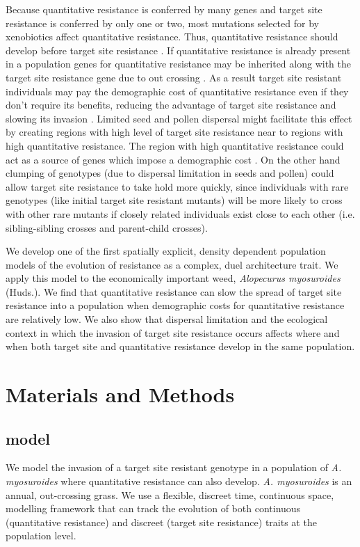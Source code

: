 \documentclass[10pt,letterpaper]{article}
\begin{document}
Because quantitative resistance is conferred by many genes and target site resistance is conferred by only one or two, most mutations selected for by xenobiotics affect quantitative resistance. Thus, quantitative resistance should develop before target site resistance \cite{Dely2010newPhy}. If quantitative resistance is already present in a population genes for quantitative resistance may be inherited along with the target site resistance gene due to out crossing \cite{Yeam2015}. As a result target site resistant individuals may pay the demographic cost of quantitative resistance even if they don't require its benefits, reducing the advantage of target site resistance and slowing its invasion \cite{Chev2008}. Limited seed and pollen dispersal might facilitate this effect by creating regions with high level of target site resistance near to regions with high quantitative resistance. The region with high quantitative resistance could act as a source of genes which impose a demographic cost \cite{Dely2010, Yeam2015}. On the other hand clumping of genotypes (due to dispersal limitation in seeds and pollen) could allow target site resistance to take hold more quickly, since individuals with rare genotypes (like initial target site resistant mutants) will be more likely to cross with other rare mutants if closely related individuals exist close to each other (i.e. sibling-sibling crosses and parent-child crosses).

We develop one of the first spatially explicit, density dependent population models of the evolution of resistance as a complex, duel architecture trait. We apply this model to the economically important weed, \textit{Alopecurus myosuroides} (Huds.). We find that quantitative resistance can slow the spread of target site resistance into a population when demographic costs for quantitative resistance are relatively low. We also show that dispersal limitation and the ecological context in which the invasion of target site resistance occurs affects where and when both target site and quantitative resistance develop in the same population. 

\section*{Materials and Methods}
\subsection*{model}
We model the invasion of a target site resistant genotype in a population of \textit{A. myosuroides} where quantitative resistance can also develop. \textit{A. myosuroides} is an annual, out-crossing grass. We use a flexible, discreet time, continuous space, modelling framework that can track the evolution of both continuous (quantitative resistance) and discreet (target site resistance) traits at the population level.     
\end{document}
